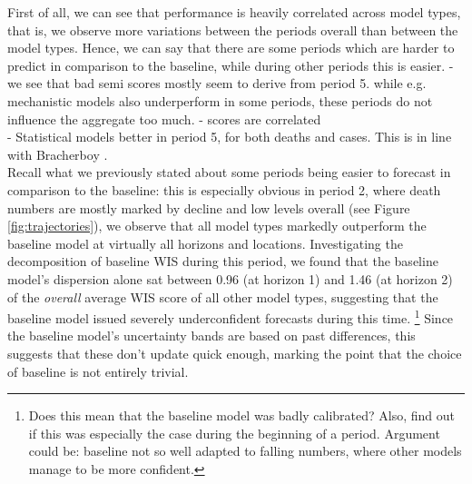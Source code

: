 First of all, we can see that performance is heavily correlated across model types, that is, we observe more variations between the periods overall than between the model types. Hence, we can say that there are some periods which are harder to predict in comparison to the baseline, while during other periods this is easier. %
- we see that bad semi scores mostly seem to derive from period 5. while e.g. mechanistic models also underperform in some periods, these periods do not influence the aggregate too much.
- scores are correlated\\
- Statistical models better in period 5, for both deaths and cases. This is in line with Bracherboy .\\
Recall what we previously stated about some periods being easier to forecast in comparison to the baseline: this is especially obvious in period 2, where death numbers are mostly marked by decline and low levels overall (see Figure \ref{fig:trajectories}), we observe that all model types markedly outperform the baseline model at virtually all horizons and locations. Investigating the decomposition of baseline WIS during this period, we found that the baseline model's dispersion alone sat between 0.96 (at horizon 1) and 1.46 (at horizon 2) of the \textit{overall} average WIS score of all other model types, suggesting that the baseline model issued severely underconfident forecasts during this time. \footnote{Does this mean that the baseline model was badly calibrated? Also, find out if this was especially the case during the beginning of a period. Argument could be: baseline not so well adapted to falling numbers, where other models manage to be more confident.} Since the baseline model's uncertainty bands are based on past differences, this suggests that these don't update quick enough, marking the point that the choice of baseline is not entirely trivial. \\
